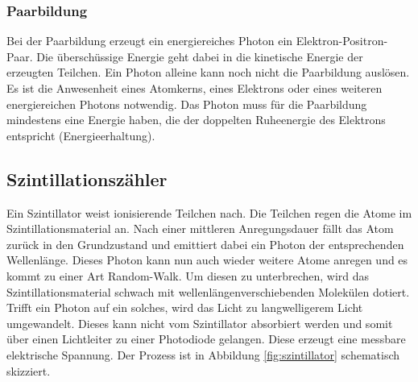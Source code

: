 \subsubsection{Paarbildung}
Bei der Paarbildung erzeugt ein energiereiches Photon ein Elektron-Positron-Paar. Die überschüssige Energie geht dabei in die kinetische Energie der erzeugten Teilchen. Ein Photon alleine kann noch nicht die Paarbildung auslösen. Es ist die Anwesenheit eines Atomkerns, eines Elektrons oder eines weiteren energiereichen Photons notwendig. Das Photon muss für die Paarbildung mindestens eine Energie haben, die der doppelten Ruheenergie des Elektrons entspricht (Energieerhaltung).

\subsection{Szintillationszähler}
Ein Szintillator weist ionisierende Teilchen nach. Die Teilchen regen die Atome im Szintillationsmaterial an. Nach einer mittleren Anregungsdauer fällt das Atom zurück in den Grundzustand und emittiert dabei ein Photon der entsprechenden Wellenlänge. Dieses Photon kann nun auch wieder weitere Atome anregen und es kommt zu einer Art Random-Walk. Um diesen zu unterbrechen, wird das Szintillationsmaterial schwach mit wellenlängenverschiebenden Molekülen dotiert. Trifft ein Photon auf ein solches, wird das Licht zu langwelligerem Licht umgewandelt. Dieses kann nicht vom Szintillator absorbiert werden und somit über einen Lichtleiter zu einer Photodiode gelangen. Diese erzeugt eine messbare elektrische Spannung. Der Prozess ist in Abbildung \ref{fig:szintillator} schematisch skizziert.
